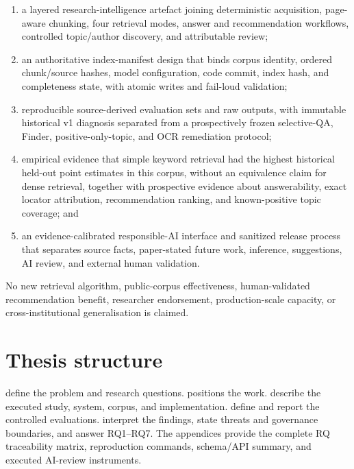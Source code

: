 \begin{enumerate}[label=C\arabic*.,leftmargin=13mm]
  \item a layered research-intelligence artefact joining deterministic acquisition, page-aware chunking, four retrieval modes, answer and recommendation workflows, controlled topic/author discovery, and attributable review;
  \item an authoritative index-manifest design that binds corpus identity, ordered chunk/source hashes, model configuration, code commit, index hash, and completeness state, with atomic writes and fail-loud validation;
  \item reproducible source-derived evaluation sets and raw outputs, with immutable historical v1 diagnosis separated from a prospectively frozen selective-QA, Finder, positive-only-topic, and OCR remediation protocol;
  \item empirical evidence that simple keyword retrieval had the highest historical held-out point estimates in this corpus, without an equivalence claim for dense retrieval, together with prospective evidence about answerability, exact locator attribution, recommendation ranking, and known-positive topic coverage; and
  \item an evidence-calibrated responsible-AI interface and sanitized release process that separates source facts, paper-stated future work, inference, suggestions, AI review, and external human validation.
\end{enumerate}

No new retrieval algorithm, public-corpus effectiveness, human-validated recommendation benefit, researcher endorsement, production-scale capacity, or cross-institutional generalisation is claimed.

\section{Thesis structure}

 define the problem and research questions.  positions the work.  describe the executed study, system, corpus, and implementation.  define and report the controlled evaluations.  interpret the findings, state threats and governance boundaries, and answer RQ1--RQ7. The appendices provide the complete RQ traceability matrix, reproduction commands, schema/API summary, and executed AI-review instruments.
